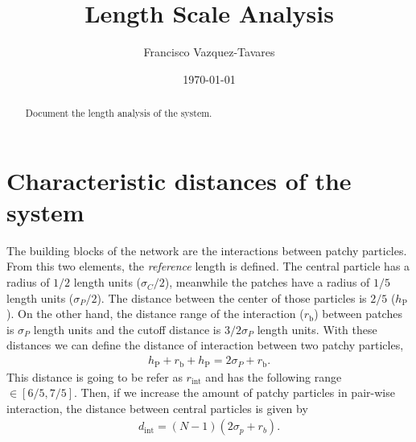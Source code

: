 \documentclass[a4paper]{tufte-handout} %
\title{Length Scale Analysis}
\author{Francisco Vazquez-Tavares}
\date{\today} %
\begin{document}
\maketitle %


\begin{abstract}
    \justifying

    Document the length analysis of the system.
\end{abstract}


\justifying

\section{Characteristic distances of the system}

The building blocks of the network are the interactions between patchy particles.
From this two elements, the \textit{reference} length is defined.
The central particle has a radius of \(1/2\) length units (\(\sigma_C/2\)), meanwhile the patches have a radius of \(1/5\) length units (\(\sigma_P/2\)).
The distance between the center of those particles is \(2/5\) (\(h_{\mathrm{P}}\)).
On the other hand, the distance range of the interaction (\(r_{\mathrm{b}}\)) between patches is \(\sigma_P\) length units and the cutoff distance is \(3/2\sigma_P\) length units.
With these distances we can define the distance of interaction between two patchy particles,
\begin{gather*}
    h_{\mathrm{P}} + r_{\mathrm{b}} + h_{\mathrm{P}} = 2\sigma_P + r_{\mathrm{b}}.
\end{gather*}
This distance is going to be refer as  \(r_{\mathrm{int}}\) and has the following range \(\in[6/5,7/5]\).
Then, if we increase the amount of patchy particles in pair-wise interaction, the distance between central particles is given by
\begin{gather*}
        d_{\mathrm{int}} = \left(N-1\right)\left(2\sigma_p + r_b\right).
\end{gather*}
\end{document}
